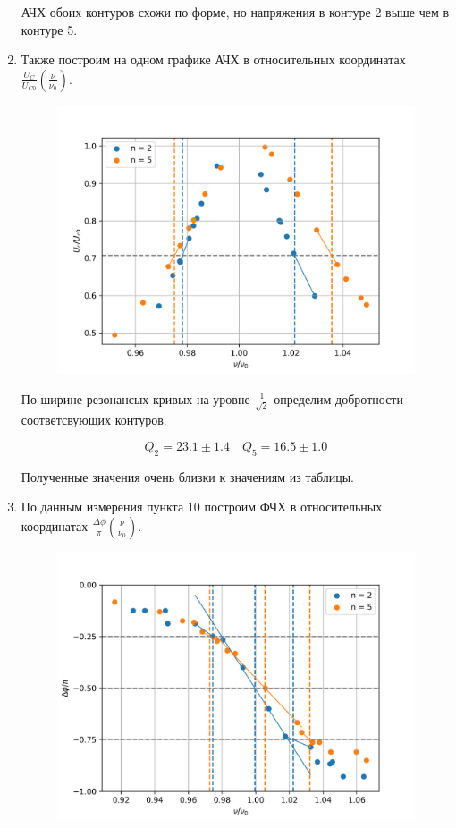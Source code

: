 \documentclass[14pt, a4paper]{report}
\begin{document}
\begin{enumerate}
АЧХ обоих контуров схожи по форме, но напряжения в контуре 2 выше чем в контуре 5.

\item Также построим на одном графике АЧХ в относительных координатах $\frac{U_C}{U_{C0}}\left(\frac{\nu}{\nu_0}\right)$.

\begin{figure}[H]
\centering
\includegraphics[scale=0.8]{images/322_2.png}
\end{figure}

По ширине резонансых кривых на уровне $\frac{1}{\sqrt{2}}$ определим добротности соответсвующих контуров.

\[Q_2=23.1\pm1.4\quad Q_5=16.5\pm1.0\]

Полученные значения очень близки к значениям из таблицы.

\item По данным измерения пункта 10 построим ФЧХ в относительных координатах $\frac{\Delta\phi}{\pi}\left(\frac{\nu}{\nu_0}\right)$.

\begin{figure}[H]
\centering
\includegraphics[scale=0.8]{images/322_3.png}
\end{figure}


\end{enumerate}
\end{document}
